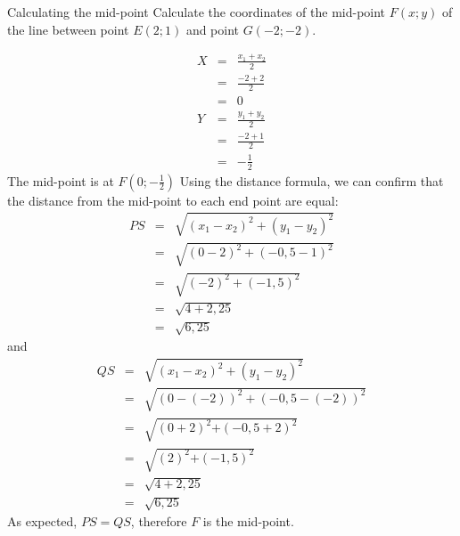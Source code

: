 \begin{wex}{Calculating the mid-point}
 {Calculate the coordinates of the mid-point $F(x;y)$ of the line between point $E(2;1)$ and point $G(-2;-2)$.}
{
\setcounter{subfigure}{0}
\begin{figure}[H] %
\begin{center}
\end{center}
\end{figure} 
\begin{eqnarray*}
X & = & \frac{{x}_{1} + {x}_{2}}{2} \\ 
& = & \frac{-2 + 2}{2} \\ 
& = & 0 \\ 
Y & = & \frac{{y}_{1} + {y}_{2}}{2} \\ 
& = & \frac{-2 + 1}{2} \\ 
& = & -\frac{1}{2} 
\end{eqnarray*}
The mid-point is at $F(0;-\frac{1}{2})$
Using the distance formula, we can confirm that the distance from the mid-point to each end point are equal: 
\begin{eqnarray*}
PS & = & \sqrt{{({x}_{1} - {x}_{2})}^{2} + {({y}_{1} - {y}_{2})}^{2}} \\ 
& = & \sqrt{{(0 - 2)}^{2} + {(-0,5 - 1)}^{2}} \\ 
& = & \sqrt{{(-2)}^{2} + {(-1,5)}^{2}} \\ 
& = & \sqrt{4 + 2,25} \\ 
& = & \sqrt{6,25}
\end{eqnarray*}
and
\begin{eqnarray*}
QS & = & \sqrt{{({x}_{1} - {x}_{2})}^{2} + {({y}_{1} - {y}_{2})}^{2}} \\ 
& = & \sqrt{{(0 - (-2))}^{2} + {(-0,5 - (-2))}^{2}} \\ 
& = & \sqrt{{(0 + 2)}^{2}{+(-0,5 + 2)}^{2}} \\ 
& = & \sqrt{{(2)}^{2}{+(-1,5)}^{2}} \\ 
& = & \sqrt{4 + 2,25} \\ 
& = & \sqrt{6,25}
\end{eqnarray*}
As expected, $PS=QS$, therefore $F$ is the mid-point. 
}
\end{wex}
